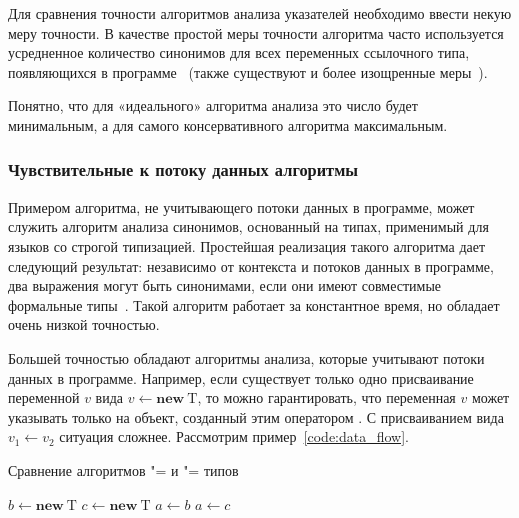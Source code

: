 \documentclass[14pt,titlepage,draft]{extarticle}
\newcommand{\type}[1]{\mathrm{#1}}
\newcommand{\op}[1]{\mathbf{#1}}
\newcommand{\subsetbased}{\eng{subset}"=\eng{based}\xspace}
\newcommand{\equalitybased}{\eng{equality}"=\eng{based}\xspace}
\begin{document}
      Для сравнения точности алгоритмов анализа указателей необходимо ввести
      некую меру точности. В качестве простой меры точности алгоритма часто
      используется усредненное количество синонимов для всех переменных
      ссылочного типа, появляющихся в
      программе~\cite[раздел~3.2]{hind_pointer_analysis_not_solved_yet}
      (также существуют и более изощренные
      меры~\cite{hind_pointer_analysis_not_solved_yet,diwan_tbaa}).

      Понятно, что для «идеального» алгоритма анализа это число будет
      минимальным, а для самого консервативного алгоритма максимальным.

      \subsubsection{Чувствительные к потоку данных алгоритмы}
        \label{section:analysis_classification_data_flow}

        Примером алгоритма, не учитывающего потоки данных в программе, может
        служить алгоритм анализа синонимов, основанный на типах, применимый
        для языков со строгой типизацией.
        Простейшая реализация такого алгоритма дает следующий результат:
        независимо от контекста и потоков данных в программе, два выражения
        могут быть синонимами, если они имеют совместимые формальные
        типы~\cite[раздел~2.2]{diwan_tbaa}.
        Такой алгоритм работает за константное время, но обладает очень низкой
        точностью.

        Большей точностью обладают алгоритмы анализа, которые учитывают потоки
        данных в программе.
        Например, если существует только одно присваивание переменной $v$ вида
        $v \gets \op{new}~\type{T}$, то можно гарантировать, что переменная $v$
        может указывать только на объект, созданный этим оператором .
        С присваиванием вида $v_1 \gets v_2$ ситуация сложнее. Рассмотрим
        пример~\ref{code:data_flow}.

        \begin{algorithm}
          \caption{Сравнение алгоритмов \subsetbased и
                                        \equalitybased типов}
          \label{code:data_flow}
          \begin{algorithmic}[1]
            \State $b \gets \op{new}~\type{T}$
            \State $c \gets \op{new}~\type{T}$
            \State $a \gets b$
            \State $a \gets c$
          \end{algorithmic}
        \end{algorithm}
\end{document}
